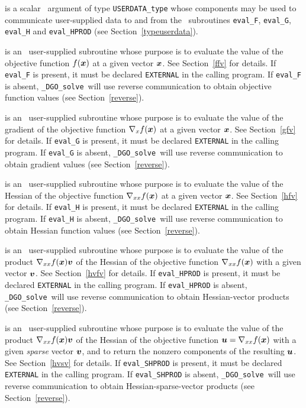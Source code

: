 \documentclass{galahad}
\newcommand{\packagename}{DGO}
\newcommand{\fullpackagename}{\libraryname\_\packagename}
\newcommand{\solver}{{\tt \fullpackagename\_solve}}
\begin{document}
\begin{description}
 is a scalar \intentinout\ argument of type
{\tt USERDATA\_type} whose components may be used
to communicate user-supplied data to and from the
\optional\ subroutines
{\tt eval\_F}, {\tt eval\_G},
{\tt eval\_H} and {\tt eval\_HPROD}
(see Section~\ref{typeuserdata}).

 is an \optional\
user-supplied subroutine whose purpose is to evaluate the value of the
objective function $f({\bm{x}})$ at a given vector ${\bm{x}}$.
See Section~\ref{ffv} for details.
If {\tt eval\_F} is present,
it must be declared {\tt EXTERNAL} in the calling program.
If {\tt eval\_F} is absent, \solver\ will use reverse communication to
obtain objective function values (see Section~\ref{reverse}).

 is an \optional\
user-supplied subroutine whose purpose is to evaluate the value of the
gradient of the objective function $\nabla_x f({\bm{x}})$ at a given vector ${\bm{x}}$.
See Section~\ref{gfv} for details.
If {\tt eval\_G} is present,
it must be declared {\tt EXTERNAL} in the calling program.
If {\tt eval\_G} is absent, \solver\ will use reverse communication to
obtain gradient values (see Section~\ref{reverse}).

 is an \optional\
user-supplied subroutine whose purpose is to evaluate the value of the
Hessian of the objective function $\nabla_{xx} f({\bm{x}})$ at a given vector ${\bm{x}}$.
See Section~\ref{hfv} for details.
If {\tt eval\_H} is present,
it must be declared {\tt EXTERNAL} in the calling program.
If {\tt eval\_H} is absent, \solver\ will use reverse communication to
obtain Hessian function values (see Section~\ref{reverse}).

\itt{eval\_HPROD} is an \optional\
user-supplied subroutine whose purpose is to evaluate the value of the
product $\nabla_{xx} f({\bm{x}}){\bm{v}}$ of the Hessian of the objective function
$\nabla_{xx} f({\bm{x}})$  with a given vector ${\bm{v}}$.
See Section~\ref{hvfv} for details.
If {\tt eval\_HPROD} is present,
it must be declared {\tt EXTERNAL} in the calling program.
If {\tt eval\_HPROD} is absent, \solver\ will use reverse communication to
obtain Hessian-vector products (see Section~\ref{reverse}).

\itt{eval\_SHPROD} is an \optional\
user-supplied subroutine whose purpose is to evaluate the value of the
product $\nabla_{xx} f({\bm{x}}){\bm{v}}$ of the Hessian of the objective function
${\bm{u}} = \nabla_{xx} f({\bm{x}})$  with a given {\em sparse} vector ${\bm{v}}$,
and to return the nonzero components of the resulting ${\bm{u}}$.
See Section~\ref{hvsv} for details.
If {\tt eval\_SHPROD} is present,
it must be declared {\tt EXTERNAL} in the calling program.
If {\tt eval\_SHPROD} is absent, \solver\ will use reverse communication to
obtain Hessian-sparse-vector products (see Section~\ref{reverse}).


\end{description}
\end{document}
